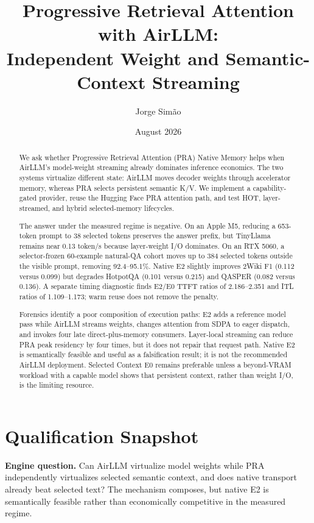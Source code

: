 \documentclass[10pt]{article}
\title{Progressive Retrieval Attention with AirLLM:\\
Independent Weight and Semantic-Context Streaming}
\author{Jorge Sim\~ao}
\date{August 2026}
\begin{document}
\maketitle

\begin{abstract}
We ask whether Progressive Retrieval Attention (PRA) Native Memory helps when
AirLLM's model-weight streaming already dominates inference economics. The two
systems virtualize different state: AirLLM moves decoder weights through
accelerator memory, whereas PRA selects persistent semantic K/V. We implement
a capability-gated provider, reuse the Hugging Face PRA attention path, and
test HOT, layer-streamed, and hybrid selected-memory lifecycles.

The answer under the measured regime is negative. On an Apple M5, reducing a
653-token prompt to 38 selected tokens preserves the answer prefix, but
TinyLlama remains near 0.13 token/s because layer-weight I/O dominates. On an
RTX 5060, a selector-frozen 60-example natural-QA cohort moves up to 384
selected tokens outside the visible prompt, removing 92.4--95.1\%. Native E2
slightly improves 2Wiki F1 (0.112 versus 0.099) but degrades HotpotQA
(0.101 versus 0.215) and QASPER (0.082 versus 0.136). A separate timing
diagnostic finds E2/E0 TTFT ratios of 2.186--2.351 and ITL ratios of
1.109--1.173; warm reuse does not remove the penalty.

Forensics identify a poor composition of execution paths: E2 adds a reference
model pass while AirLLM streams weights, changes attention from SDPA to eager
dispatch, and invokes four late direct-plus-memory consumers. Layer-local
streaming can reduce PRA peak residency by four times, but it does not repair
that request path. Native E2 is semantically feasible and useful as a
falsification result; it is not the recommended AirLLM deployment. Selected
Context E0 remains preferable unless a beyond-VRAM workload with a capable
model shows that persistent context, rather than weight I/O, is the limiting
resource.
\end{abstract}

\section{Qualification Snapshot}
\textbf{Engine question.} Can AirLLM virtualize model weights while PRA
independently virtualizes selected semantic context, and does native transport
already beat selected text? The mechanism composes, but native E2 is
semantically feasible rather than economically competitive in the measured
regime.
\end{document}
